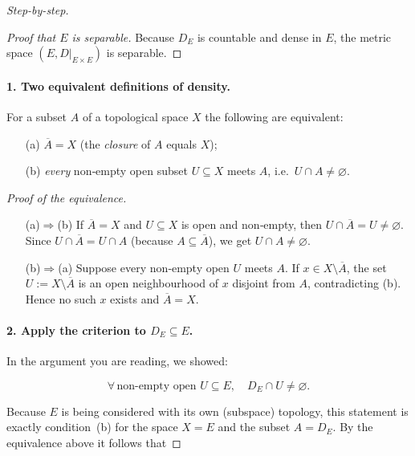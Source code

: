 \documentclass[12pt]{article}
\theoremstyle{definition} %
\theoremstyle{plain} %
\begin{document}
\begin{proof}[Step-by-step]
\begin{proof}[Proof that \(E\) is separable]
  \noindent
  Because \(D_E\) is countable and dense in \(E\), the metric space
  \((E,D|_{E\times E})\) is separable.  \qedhere
  \end{proof}

\paragraph{1.  Two equivalent definitions of density.}
For a subset \(A\) of a topological space \(X\) the following are
equivalent:

\begin{enumerate}
    \item[(a)] \(\overline{A}=X\) (the \emph{closure} of \(A\) equals \(X\));
    \item[(b)] \textit{every} non‑empty open subset \(U\subseteq X\) meets
               \(A\), i.e.\ \(U\cap A\neq\varnothing\).
\end{enumerate}

\noindent
\emph{Proof of the equivalence.}
\begin{itemize}
    \item[(a)\(\Rightarrow\)(b)]  
          If \(\overline{A}=X\) and \(U\subseteq X\) is open and non‑empty,
          then \(U\cap\overline{A}=U\neq\varnothing\).  
          Since \(U\cap\overline{A}= U\cap A\) (because \(A\subseteq\overline{A}\)),
          we get \(U\cap A\neq\varnothing\).
    \item[(b)\(\Rightarrow\)(a)]  
          Suppose every non‑empty open \(U\) meets \(A\).
          If \(x\in X\setminus\overline{A}\), the set
          \(U:=X\setminus\overline{A}\) is an open neighbourhood of \(x\)
          disjoint from \(A\), contradicting (b).  Hence no such \(x\) exists
          and \(\overline{A}=X\).
\end{itemize}

\paragraph{2.  Apply the criterion to \(D_E\subseteq E\).}
In the argument you are reading, we showed:

\[
    \forall\,\text{non‑empty open }U\subseteq E,\quad D_E\cap U\neq\varnothing.
\]

Because \(E\) is being considered with its own (subspace) topology, this
statement is exactly condition (b) for the space \(X=E\) and the subset
\(A=D_E\).  By the equivalence above it follows that


\end{proof}
\end{document}
